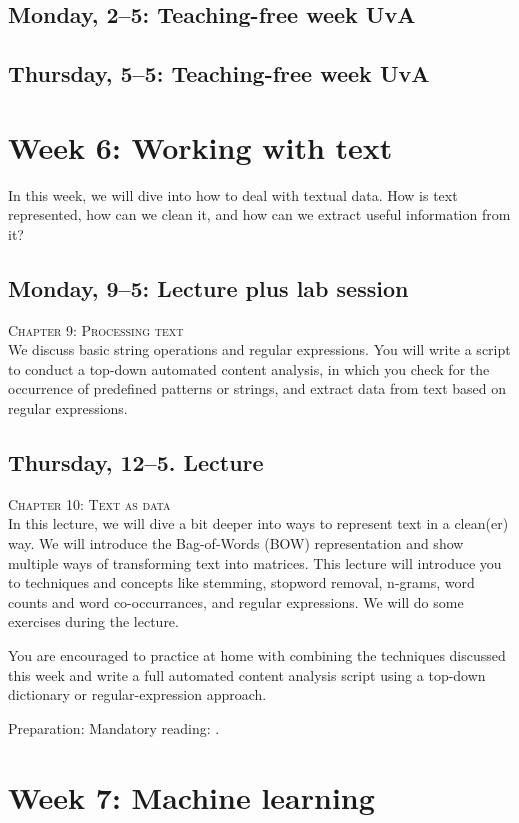 \subsection*{Monday, 2--5: Teaching-free week UvA}
\subsection*{Thursday, 5--5: Teaching-free week UvA}


\section*{Week 6: Working with text}

In this week, we will dive into how to deal with textual data. How is text represented, how can we clean it, and how can we extract useful information from it?

\subsection*{Monday, 9--5: Lecture plus lab session}
\textsc{ Chapter 9: Processing text}\\
We discuss basic string operations and regular expressions. You will write a script to conduct a top-down automated content analysis, in which you check for the occurrence of predefined patterns or strings, and extract data from text based on regular expressions.

\subsection*{Thursday, 12--5. Lecture}
\textsc{ Chapter 10: Text as data}\\
In this lecture, we will dive a bit deeper into ways to represent text in a clean(er) way. We will introduce the Bag-of-Words (BOW) representation and show multiple ways of transforming text into matrices. This lecture will introduce you to techniques and concepts like stemming, stopword removal, n-grams, word counts and word co-occurrances, and regular expressions. We will do some exercises during the lecture.

You are encouraged to practice at home with combining the techniques discussed this week and write a full automated content analysis script using a top-down dictionary or regular-expression approach.

Preparation: Mandatory reading: \cite{Boumans2016}.

\section*{Week 7: Machine learning}

